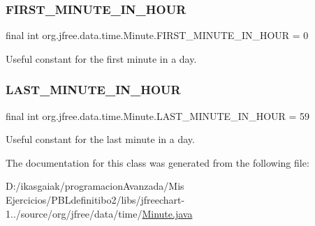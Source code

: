 \subsubsection{\texorpdfstring{F\+I\+R\+S\+T\+\_\+\+M\+I\+N\+U\+T\+E\+\_\+\+I\+N\+\_\+\+H\+O\+UR}{FIRST\_MINUTE\_IN\_HOUR}}
{\footnotesize\ttfamily final int org.\+jfree.\+data.\+time.\+Minute.\+F\+I\+R\+S\+T\+\_\+\+M\+I\+N\+U\+T\+E\+\_\+\+I\+N\+\_\+\+H\+O\+UR = 0\hspace{0.3cm}{\ttfamily [static]}}

Useful constant for the first minute in a day. \mbox{\label{classorg_1_1jfree_1_1data_1_1time_1_1_minute_aba2476db31e4a1b8aecbb439d9e04d5a}} 
\subsubsection{\texorpdfstring{L\+A\+S\+T\+\_\+\+M\+I\+N\+U\+T\+E\+\_\+\+I\+N\+\_\+\+H\+O\+UR}{LAST\_MINUTE\_IN\_HOUR}}
{\footnotesize\ttfamily final int org.\+jfree.\+data.\+time.\+Minute.\+L\+A\+S\+T\+\_\+\+M\+I\+N\+U\+T\+E\+\_\+\+I\+N\+\_\+\+H\+O\+UR = 59\hspace{0.3cm}{\ttfamily [static]}}

Useful constant for the last minute in a day. 

The documentation for this class was generated from the following file\+:\begin{DoxyCompactItemize}
\item 
D\+:/ikasgaiak/programacion\+Avanzada/\+Mis Ejercicios/\+P\+B\+Ldefinitibo2/libs/jfreechart-\/1../source/org/jfree/data/time/\mbox{\hyperlink{_minute_8java}{Minute.\+java}}\end{DoxyCompactItemize}
